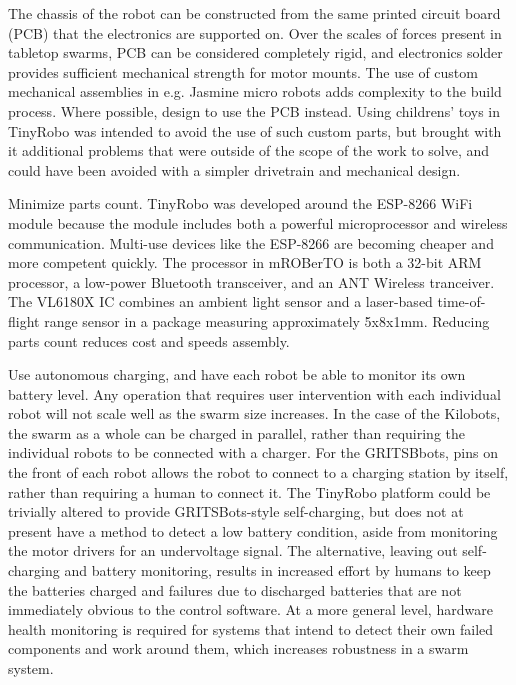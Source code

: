 \documentclass[]{article}
\begin{document}
The chassis of the robot can be constructed from the same printed circuit board (PCB) that the electronics are supported on. 
Over the scales of forces present in tabletop swarms, PCB can be considered completely rigid, and electronics solder provides sufficient mechanical strength for motor mounts. 
The use of custom mechanical assemblies in e.g. Jasmine micro robots adds complexity to the build process. 
Where possible, design to use the PCB instead. 
Using childrens' toys in TinyRobo was intended to avoid the use of such custom parts, but brought with it additional problems that were outside of the scope of the work to solve, and could have been avoided with a simpler drivetrain and mechanical design. 

Minimize parts count. 
TinyRobo was developed around the ESP-8266 WiFi module because the module includes both a powerful microprocessor and wireless communication. 
Multi-use devices like the ESP-8266 are becoming cheaper and more competent quickly.
The processor in mROBerTO is both a 32-bit ARM processor, a low-power Bluetooth transceiver, and an ANT Wireless tranceiver. 
The VL6180X IC combines an ambient light sensor and a laser-based time-of-flight range sensor in a package measuring approximately 5x8x1mm. 
Reducing parts count reduces cost and speeds assembly. 

Use autonomous charging, and have each robot be able to monitor its own battery level. 
Any operation that requires user intervention with each individual robot will not scale well as the swarm size increases. 
In the case of the Kilobots, the swarm as a whole can be charged in parallel, rather than requiring the individual robots to be connected with a charger. 
For the GRITSBbots, pins on the front of each robot allows the robot to connect to a charging station by itself, rather than requiring a human to connect it. 
The TinyRobo platform could be trivially altered to provide GRITSBots-style self-charging, but does not at present have a method to detect a low battery condition, aside from monitoring the motor drivers for an undervoltage signal. 
The alternative, leaving out self-charging and battery monitoring, results in increased effort by humans to keep the batteries charged and failures due to discharged batteries that are not immediately obvious to the control software. 
At a more general level, hardware health monitoring is required for systems that intend to detect their own failed components and work around them, which increases robustness in a swarm system. 
\end{document}
